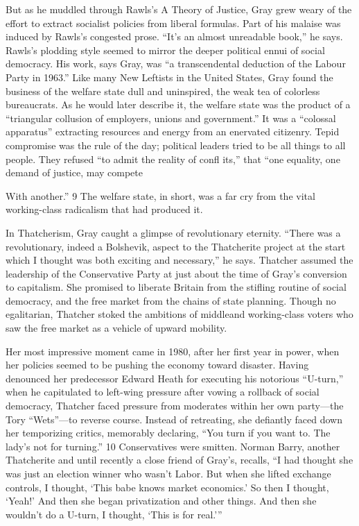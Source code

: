  \par 
But as he muddled through Rawls’s A Theory of Justice, Gray grew weary of the effort to extract socialist policies from liberal formulas. Part of his malaise was induced by Rawls’s congested prose. “It’s an almost unreadable book,” he says. Rawls’s plodding style seemed to mirror the deeper political ennui of social democracy. His work, says Gray, was “a transcendental deduction of the Labour Party in 1963.” Like many New Leftists in the United States, Gray found the business of the welfare state dull and uninspired, the weak tea of colorless bureaucrats. As he would later describe it, the welfare state was the product of a “triangular collusion of employers, unions and government.” It was a “colossal apparatus” extracting resources and energy from an enervated citizenry. Tepid compromise was the rule of the day; political leaders tried to be all things to all people. They refused “to admit the reality of confl its,” that “one equality, one demand of justice, may compete
 \par 
With another.” {\color{blue}9} The welfare state, in short, was a far cry from the vital working-class radicalism that had produced it.
 \par 
In Thatcherism, Gray caught a glimpse of revolutionary eternity. “There was a revolutionary, indeed a Bolshevik, aspect to the Thatcherite project at the start which I thought was both exciting and necessary,” he says. Thatcher assumed the leadership of the Conservative Party at just about the time of Gray’s conversion to capitalism. She promised to liberate Britain from the stifling routine of social democracy, and the free market from the chains of state planning. Though no egalitarian, Thatcher stoked the ambitions of middleand working-class voters who saw the free market as a vehicle of upward mobility.
 \par 
Her most impressive moment came in 1980, after her first year in power, when her policies seemed to be pushing the economy toward disaster. Having denounced her predecessor Edward Heath for executing his notorious “U-turn,” when he capitulated to left-wing pressure after vowing a rollback of social democracy, Thatcher faced pressure from moderates within her own party—the Tory “Wets”—to reverse course. Instead of retreating, she defiantly faced down her temporizing critics, memorably declaring, “You turn if you want to. The lady’s not for turning.” {\color{blue}10} Conservatives were smitten. Norman Barry, another Thatcherite and until recently a close friend of Gray’s, recalls, “I had thought she was just an election winner who wasn’t Labor. But when she lifted exchange controls, I thought, ‘This babe knows market economics.’ So then I thought, ‘Yeah!’ And then she began privatization and other things. And then she wouldn’t do a U-turn, I thought, ‘This is for real.’”
